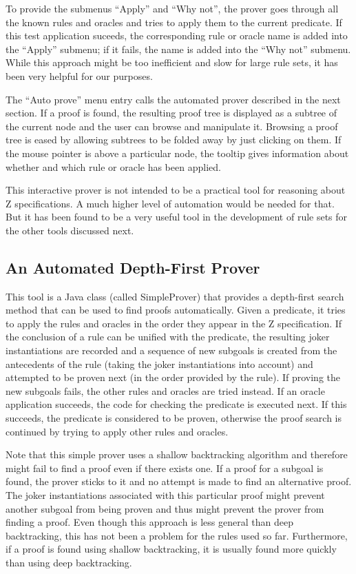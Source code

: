 \documentclass{entcs}
\begin{document}
To provide the submenus ``Apply'' and ``Why not'', the prover goes
through all the known rules and oracles and tries to apply them to the
current predicate.  If this test application suceeds, the
corresponding rule or oracle name is added into the ``Apply''
submenu; if it fails, the name is added into the ``Why not''
submenu.  While this approach might be too inefficient and slow for
large rule sets, it has been very helpful for our purposes.

The ``Auto prove'' menu entry calls the automated prover described in
the next section.  If a proof is found, the resulting proof tree is
displayed as a subtree of the current node and the user can browse and
manipulate it.  Browsing a proof tree is eased by allowing subtrees to
be folded away by just clicking on them.  If the mouse pointer is
above a particular node, the tooltip gives information about whether
and which rule or oracle has been applied.

This interactive prover is not intended to be a practical tool for
reasoning about Z specifications.  A much higher level of automation
would be needed for that.  But it has been found to be a very useful
tool in the development of rule sets for the other tools discussed
next.

\subsection{An Automated Depth-First Prover}

This tool is a Java class (called SimpleProver) that provides a
depth-first search method that can be used to find proofs
automatically.  Given a predicate, it tries to apply the rules and
oracles in the order they appear in the Z specification.  If the
conclusion of a rule can be unified with the predicate, the resulting
joker instantiations are recorded and a sequence of new subgoals is
created from the antecedents of the rule (taking the joker
instantiations into account) and attempted to be proven next (in the
order provided by the rule).  If proving the new subgoals fails, the
other rules and oracles are tried instead.  If an oracle application
succeeds, the code for checking the predicate is executed next.  If
this succeeds, the predicate is considered to be proven, otherwise the
proof search is continued by trying to apply other rules and oracles.

Note that this simple prover uses a shallow backtracking algorithm and
therefore might fail to find a proof even if there exists one.  If a
proof for a subgoal is found, the prover sticks to it and no attempt
is made to find an alternative proof.  The joker instantiations
associated with this particular proof might prevent another subgoal
from being proven and thus might prevent the prover from finding a
proof.  Even though this approach is less general than deep
backtracking, this has not been a problem for the rules used so far.
Furthermore, if a proof is found using shallow backtracking, it is
usually found more quickly than using deep backtracking.
\end{document}
